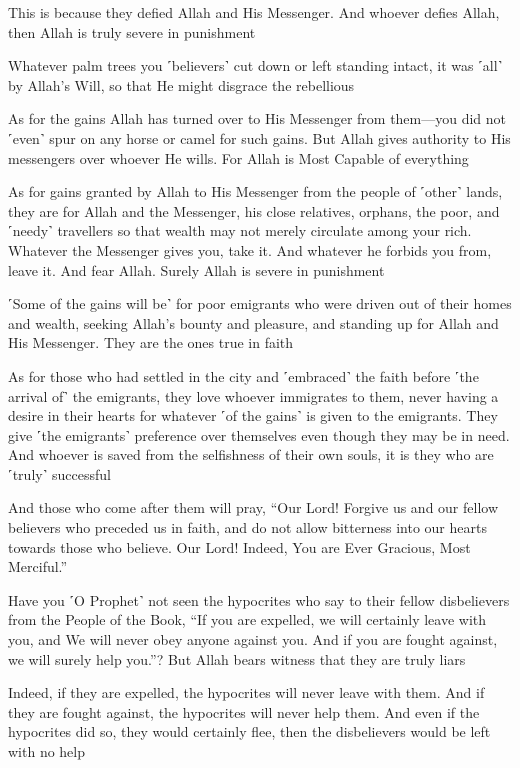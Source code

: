 This is because they defied Allah and His Messenger. And whoever defies Allah, then Allah is truly severe in punishment

Whatever palm trees you ˹believers˺ cut down or left standing intact, it was ˹all˺ by Allah’s Will, so that He might disgrace the rebellious

As for the gains Allah has turned over to His Messenger from them—you did not ˹even˺ spur on any horse or camel for such gains. But Allah gives authority to His messengers over whoever He wills. For Allah is Most Capable of everything

As for gains granted by Allah to His Messenger from the people of ˹other˺ lands, they are for Allah and the Messenger, his close relatives, orphans, the poor, and ˹needy˺ travellers so that wealth may not merely circulate among your rich. Whatever the Messenger gives you, take it. And whatever he forbids you from, leave it. And fear Allah. Surely Allah is severe in punishment

˹Some of the gains will be˺ for poor emigrants who were driven out of their homes and wealth, seeking Allah’s bounty and pleasure, and standing up for Allah and His Messenger. They are the ones true in faith

As for those who had settled in the city and ˹embraced˺ the faith before ˹the arrival of˺ the emigrants, they love whoever immigrates to them, never having a desire in their hearts for whatever ˹of the gains˺ is given to the emigrants. They give ˹the emigrants˺ preference over themselves even though they may be in need. And whoever is saved from the selfishness of their own souls, it is they who are ˹truly˺ successful

And those who come after them will pray, “Our Lord! Forgive us and our fellow believers who preceded us in faith, and do not allow bitterness into our hearts towards those who believe. Our Lord! Indeed, You are Ever Gracious, Most Merciful.”

Have you ˹O Prophet˺ not seen the hypocrites who say to their fellow disbelievers from the People of the Book, “If you are expelled, we will certainly leave with you, and We will never obey anyone against you. And if you are fought against, we will surely help you.”? But Allah bears witness that they are truly liars

Indeed, if they are expelled, the hypocrites will never leave with them. And if they are fought against, the hypocrites will never help them. And even if the hypocrites did so, they would certainly flee, then the disbelievers would be left with no help

